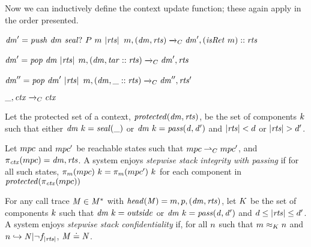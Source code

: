 \documentclass[acmsmall,review,anonymous]{acmart}\settopmatter{printfolios=true,printccs=false,printacmref=false}
\begin{document}
Now we can inductively define the context update function; these again apply in the order
presented. 

            {\(\mathit{dm}' = \mathit{push} ~ \mathit{dm} ~ \mathit{seal?} ~ P ~ m ~ |\mathit{rts}|\)}
            {\(m,(\mathit{dm},\mathit{rts}) \xrightarrow{}_C \mathit{dm}',(\mathit{isRet} ~ m)::\mathit{rts}\)}

\vspace*{-1ex}
            {\(\mathit{dm}' = \mathit{pop} ~ \mathit{dm} ~ |\mathit{rts}|\)}
            {\(m,(\mathit{dm},\mathit{tar}::\mathit{rts}) \xrightarrow{}_C \mathit{dm}',\mathit{rts}\)}

\vspace*{-1ex}
              {\(\mathit{dm}'' = \mathit{pop} ~ \mathit{dm}' ~ |\mathit{rts}|\)}
              {\(m,(\mathit{dm},\_::\mathit{rts}) \xrightarrow{}_C \mathit{dm}'',\mathit{rts}'\)}

\vspace*{-3.5ex}            
\judgment[ Default]
         {}
         {\(\_,\mathit{ctx} \xrightarrow{}_C \mathit{ctx}\)}

 Let the protected set of a context, \(\mathit{protected}(\mathit{dm},\mathit{rts})\),
be the set of components \(k\) such that either \(\mathit{dm} ~ k = \mathit{seal(\_)}\)
or \(\mathit{dm} ~ k = \mathit{pass(d,d')}\) and \(|\mathit{rts}| < d\) or
\(|\mathit{rts}| > d'\).


Let \(mpc\) and \(mpc'\) be reachable states such that
\(mpc \overset{}{\rightharpoonup}_C mpc'\), and \(\pi_{\mathit{ctx}}(mpc) = \mathit{dm},\mathit{rts}\).
A system enjoys {\em stepwise stack integrity with passing} if for all
such states, \(\pi_m(mpc) ~ k = \pi_m(mpc') ~ k\)
for each component in \(\mathit{protected}(\pi_{\mathit{ctx}}(mpc))\)


For any call trace \(\mathit{M} \in \mathit{M}^*\) with \(\mathit{head}(\mathit{M}) = m,p,(\mathit{dm},\mathit{rts})\),
let \(K\) be the set of components \(k\) such that
\(\mathit{dm} ~ k = \mathit{outside}\) or \(\mathit{dm} ~ k = \mathit{pass(d,d')}\)
and \(d \leq |\mathit{rts}| \leq d'\). A system enjoys
\emph{stepwise stack confidentiality} if,
for all \(n\) such that \(m \approx_K n\) and
\(n \hookrightarrow \mathit{N} | \neg f_{|\mathit{rts}|}\),
\(\mathit{M} \doteq \mathit{N}\).
\end{document}
